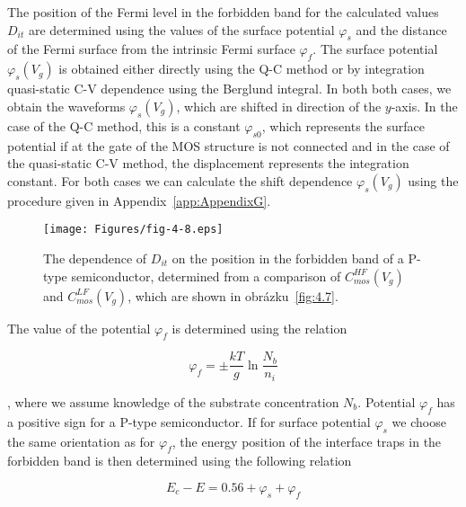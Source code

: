 \par The position of the Fermi level in the forbidden band for the
calculated values $D_{it}$ are determined using the values of the
surface potential $\varphi_{s}$ and the distance of the Fermi surface
from the intrinsic Fermi surface $\varphi_{f}$. The surface potential
$\varphi_{s} (V_{g})$ is obtained either directly using the Q-C method
or by integration quasi-static C-V dependence using the Berglund
integral. In both both cases, we obtain the waveforms
$\varphi_{s} (V_{g})$, which are shifted in direction of the
$y$-axis. In the case of the Q-C method, this is a constant
$\varphi_{s0}$, which represents the surface potential if at the gate
of the MOS structure is not connected and in the case of the
quasi-static C-V method, the displacement represents the integration
constant. For both cases we can calculate the shift dependence
$\varphi_{s} (V_{g})$ using the procedure given in
Appendix~\ref{app:AppendixG}.

\begin{figure}[h!]\centering
  \texttt{[image: Figures/fig-4-8.eps]}
  \caption[Dependence of $D_{it}$ on the position in the forbidden
    band of the semiconductor of a P-type semiconductor, determined
    from the comparison of $C_{mos}^{HF} (V_{g})$ and
    $C_{mos}^{LF} (V_{g})$]{The dependence of $D_{it}$ on the position
    in the forbidden band of a P-type semiconductor, determined from a
    comparison of $C_{mos}^{HF} (V_{g})$ and $C_{mos}^{LF} (V_{g})$,
    which are shown in obrázku~\ref{fig:4.7}.}\label{fig:4.8}
\end{figure}

The value of the potential $\varphi_{f}$ is determined using the relation

\begin{equation}\label{eq:4.16}
  \varphi_{f} = \pm \frac{kT}{g} \ln{\frac{N_{b}}{n_{i}}}
\end{equation}

, where we assume knowledge of the substrate concentration
$N_{b}$. Potential $\varphi_{f}$ has a positive sign for a P-type
semiconductor. If for surface potential $\varphi_{s}$ we choose the
same orientation as for $\varphi_{f}$, the energy position of the
interface traps in the forbidden band is then determined using the
following relation

\begin{equation}\label{eq:4.17}
  E_{c} - E = 0.56 + \varphi_{s} + \varphi_{f}
\end{equation}

